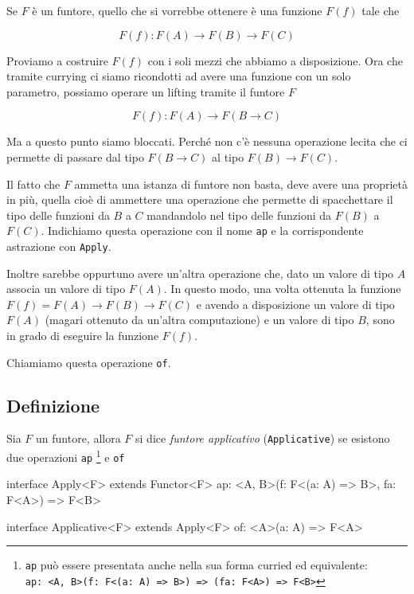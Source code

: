 \documentclass[12pt]{article}
\theoremstyle{definition}
\newenvironment{code}
  {\vspace{0.5cm} \VerbatimEnvironment\begin{typescriptcode}}
  {\end{typescriptcode} \vspace{0.2cm}}
\begin{document}
Se $F$ è un funtore, quello che si vorrebbe ottenere è una funzione $F(f)$ tale che

$$
F(f): F(A) \rightarrow F(B) \rightarrow F(C)
$$

Proviamo a costruire $F(f)$ con i soli mezzi che abbiamo a disposizione.
Ora che tramite currying ci siamo ricondotti ad avere una funzione con un solo parametro, possiamo operare un lifting tramite il funtore $F$

$$
F(f): F(A) \rightarrow F(B \rightarrow C)
$$

Ma a questo punto siamo bloccati.
Perché non c'è nessuna operazione lecita che ci permette di passare dal tipo $F(B \rightarrow C)$ al tipo $F(B) \rightarrow F(C)$.

Il fatto che $F$ ammetta una istanza di funtore non basta, deve avere una proprietà in più, quella cioè di ammettere una operazione che permette di
spacchettare il tipo delle funzioni da $B$ a $C$ mandandolo nel tipo delle funzioni da $F(B)$ a $F(C)$.
Indichiamo questa operazione con il nome \texttt{ap} e la corrispondente astrazione con \texttt{Apply}.

Inoltre sarebbe oppurtuno avere un'altra operazione che, dato un valore di tipo $A$ associa un valore di tipo $F(A)$.
In questo modo, una volta ottenuta la funzione $F(f) = F(A) \rightarrow F(B) \rightarrow F(C)$ e avendo a disposizione un valore di tipo $F(A)$
(magari ottenuto da un'altra computazione) e un valore di tipo $B$, sono in grado di eseguire la funzione $F(f)$.

Chiamiamo questa operazione \texttt{of}.

\subsection{Definizione}

Sia $F$ un funtore, allora $F$ si dice \emph{funtore applicativo} (\texttt{Applicative})
se esistono due operazioni \texttt{ap}
\footnote{\texttt{ap} può essere presentata anche nella sua forma curried ed equivalente:\\
\texttt{ap: <A, B>(f: F<(a: A) => B>) => (fa: F<A>) => F<B>}
}
e \texttt{of}

\begin{code}
interface Apply<F> extends Functor<F> {
  ap: <A, B>(f: F<(a: A) => B>, fa: F<A>) => F<B>
}

interface Applicative<F> extends Apply<F> {
  of: <A>(a: A) => F<A>
}
\end{code}
\end{document}
